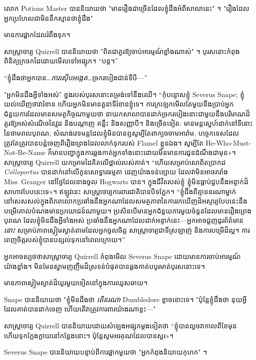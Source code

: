 {{លោក Potions Master បាននិយាយថា "មានរឿងជាច្រើនដែលខ្ញុំដឹងអំពីសាលានេះ" ។ "រឿងដែលអ្នកប្រហែលជាមិននឹកស្មានថាខ្ញុំដឹង"

មានការផ្អាកដែលរំពឹងទុក។

សាស្រ្តាចារ្យ Quirrell បាននិយាយថា "ពិតជាគួរឱ្យចាប់អារម្មណ៍ខ្លាំងណាស់" ។ បុរស​នោះ​កំពុង​ពិនិត្យ​ក្រចកដៃ​ដោយ​មើលទៅ​អផ្សុក។ “បន្ត។”

“ខ្ញុំដឹងថាអ្នកបាន…\emph{ការស៊ើបអង្កេត}…ច្រករបៀងជាន់ទីបី—”

"អ្នកមិនដឹងអ្វីទាំងអស់" ខ្នង​របស់​បុរស​នោះ​តម្រង់​ទៅ​នឹង​ឈើ។ “កុំបន្ទោសខ្ញុំ Severus Snape; ខ្ញុំយល់ឃើញថាវារំខាន ហើយអ្នកមិនមានតួនាទីរំខានខ្ញុំទេ។ ការក្រឡេកមើលតែមួយនឹងប្រាប់អ្នកជំនួយការដែលមានសមត្ថកិច្ចណាមួយថា នាយកសាលាបានដាក់ច្រករបៀងនោះជាមួយនឹងបរិមាណដ៏គួរឱ្យអស់សំណើចនៃវួដ និងបណ្តាញ គន្លឹះ និងសញ្ញាបី។ និងច្រើនទៀត: មានមន្តស្នេហ៍ដាក់នៅទីនោះនៃថាមពលបុរាណ, សំណង់វេទមន្តដែលខ្ញុំមិនបានឮសូម្បីតែពាក្យចចាមអារ៉ាម, បច្ចេកទេសដែលត្រូវតែត្រូវបានបន្លំចេញពីរឿងព្រេងដែលលាក់ទុករបស់ Flamel ខ្លួនឯង។ សូម្បីតែ He-Who-Must-Not-Be-Name ក៏មានបញ្ហាក្នុងការឆ្លងកាត់អ្នកទាំងនោះដោយមិនមានការជូនដំណឹងជាមុន»។ សាស្ត្រាចារ្យ Quirrell យកម្រាមដៃគិតលើថ្ពាល់របស់គាត់។ “ហើយសម្រាប់សោពិតប្រាកដ \emph{Colloportus} បានដាក់នៅលើកូនសោទ្វារធម្មតា ដេញយ៉ាងទន់ខ្សោយ ដែលវាមិនអាចរារាំង Miss~Granger នៅថ្ងៃដែលនាងចូល Hogwarts បាន។ ក្នុង​ជីវិត​របស់​ខ្ញុំ ខ្ញុំ​មិន​ធ្លាប់​ជួប​នឹង​អន្ទាក់​ដ៏​សាហាវ​បែប​នេះ​ទេ»។ ឥឡូវ​នេះ សាស្ត្រាចារ្យ​ការពារ​ជាតិ​បាន​បិទ​ភ្នែក។ “ខ្ញុំដឹងពីគ្មាននរណាម្នាក់នៅសេសសល់ក្នុងពិភពលោកប្រឆាំងនឹងអ្នកណាដែលសមត្ថភាពនៃការរកឃើញដ៏អស្ចារ្យបែបនេះនឹងបម្រើគោលបំណងមានប្រយោជន៍ណាមួយ។ ប្រសិនបើមានអ្នកជំនួយការមួយចំនួនដែលមានរឿងព្រេងបុរាណ ដែលខ្ញុំមិនដឹងអ្វីទាំងអស់ ប្រឆាំងនឹងអ្នកណាដែលដាក់អន្ទាក់នេះ—អ្នកអាចជួញដូរព័ត៌មាន \emph{នោះ} សម្រាប់ភាពស្ងៀមស្ងាត់តាមដែលអ្នកចូលចិត្ត សាស្រ្តាចារ្យជាទីស្រឡាញ់ និងការបម្រើដ៏ល្អ។ ការពេញចិត្តរបស់ខ្ញុំបានបន្សល់ទុកនៅពេលក្រោយ។”

អ្នកអាចស្បថថាសាស្រ្តាចារ្យ Quirrell កំពុងមើល Severus Snape ដោយមានការចាប់អារម្មណ៍យ៉ាងខ្លាំង។ មិនមែន​ស្នាម​ញញឹម​ដ៏​ស្រទន់​បំផុត​បាន​ឆ្លងកាត់​បបូរមាត់​បុរស​នោះ​ទេ។

មាន​ភាព​ស្ងៀម​ស្ងាត់​ដ៏​យូរ​មួយ​ទៀត​នៅ​ក្នុង​ការ​ឈូស​ឆាយ។

Snape បាននិយាយថា "ខ្ញុំមិនដឹងថា \emph{តើនរណា} Dumbledore ខ្លាចនោះទេ។ "ប៉ុន្តែខ្ញុំដឹងថា នុយអ្វី ដែលគាត់បានដាក់ចេញ ហើយតើវាត្រូវការពារយ៉ាងណាខ្លះ—"

សាស្ត្រាចារ្យ Quirrell បាននិយាយដោយសំឡេងអផ្សុកម្តងទៀតថា “ខ្ញុំបានលួចវាកាលពីខែមុន ហើយទុកក្លែងក្លាយនៅកន្លែងនោះ។ ប៉ុន្តែ​សូម​អរគុណ​ដែល​បាន​សួរ​»​។

Severus Snape បាននិយាយបន្ទាប់ពីការផ្អាកមួយថា "អ្នកកំពុងនិយាយកុហក" ។

}}
